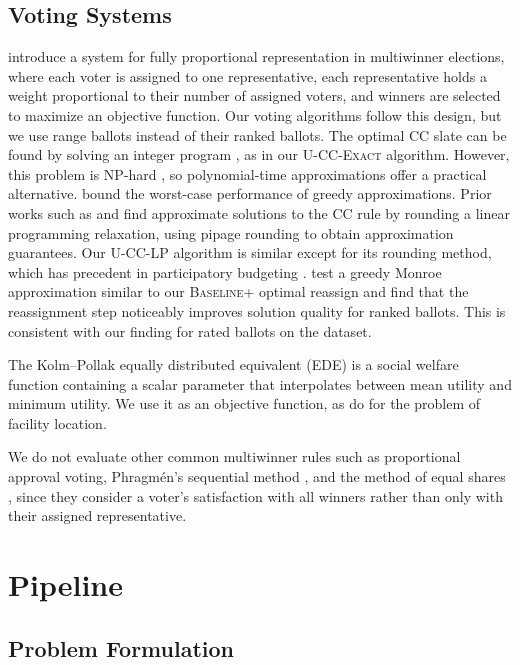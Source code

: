 \documentclass[letterpaper]{article} %
\newcommand{\Exact}{\textsc{U-CC-Exact}}
\newcommand{\LP}{\textsc{U-CC-LP}}
\newcommand{\Baseline}{\textsc{Baseline}}
\begin{document}
\subsection{Voting Systems}
\citet{chamberlin-courant} introduce a system for fully proportional representation in multiwinner elections, where each voter is assigned to one representative, each representative holds a weight proportional to their number of assigned voters, and winners are selected to maximize an objective function.
Our voting algorithms follow this design, but we use range ballots instead of their ranked ballots.
The optimal CC slate can be found by solving an integer program \citep{potthoff-brams-1998}, as in our \Exact{} algorithm.
However, this problem is NP-hard \citep{procaccia-2008, lu-boutilier-2011}, so polynomial-time approximations offer a practical alternative.
\citep{nemhauser-1978, lu-boutilier-2011} bound the worst-case performance of greedy approximations.
Prior works such as \citet{ageev-sviridenko-2004} and \citet{calinescu-2007} find approximate solutions to the CC rule by rounding a linear programming relaxation, using pipage rounding to obtain approximation guarantees.
Our \LP{} algorithm is similar except for its rounding method, which has precedent in participatory budgeting \citep{sreedurga-2022}.
\citet{skowron-2015} test a greedy Monroe approximation similar to our \Baseline + optimal reassign and find that the reassignment step noticeably improves solution quality for ranked ballots.
This is consistent with our finding for rated ballots on the \citet{fish-v2} dataset.

The Kolm--Pollak equally distributed equivalent (EDE) \citep{kolm-1976, pollak-1971} is a social welfare function containing a scalar parameter that interpolates between mean utility and minimum utility. We use it as an objective function, as \citet{horton-2025} do for the problem of facility location.

We do not evaluate other common multiwinner rules such as proportional approval voting, Phragm\'{e}n's sequential method \citep{janson_phragmens_2016}, and the method of equal shares \citep{peters_proportional_2022}, since they consider a voter's satisfaction with all winners rather than only with their assigned representative.

\section{Pipeline}

\subsection{Problem Formulation}
\label{sec:problem-formulation}
\end{document}
